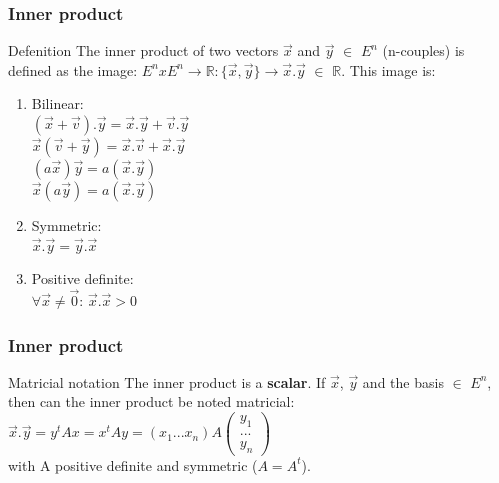 \begin{frame}
	\frametitle{Inner product}
	\begin{block}{Defenition}
		The inner product of two vectors $\overrightarrow{x}$ and $\overrightarrow{y}$ $\in$ $E^n$ (n-couples) is defined as the image: $E^nxE^n\to\mathbb{R}:\{\overrightarrow{x},\overrightarrow{y}\}\to\overrightarrow{x}.\overrightarrow{y}$ $\in$ $\mathbb{R}$. This image is:
		\begin{enumerate}
			\item Bilinear:\\ $(\overrightarrow{x}+\overrightarrow{v}).\overrightarrow{y}=\overrightarrow{x}.\overrightarrow{y}+\overrightarrow{v}.\overrightarrow{y}$\\
			$\overrightarrow{x}(\overrightarrow{v}+\overrightarrow{y})=\overrightarrow{x}.\overrightarrow{v}+\overrightarrow{x}.\overrightarrow{y}$\\
			$(a\overrightarrow{x})\overrightarrow{y}=a(\overrightarrow{x}.\overrightarrow{y})$\\
			$\overrightarrow{x}(a\overrightarrow{y})=a(\overrightarrow{x}.\overrightarrow{y})$
			\item Symmetric:\\
			$\overrightarrow{x}.\overrightarrow{y}=\overrightarrow{y}.\overrightarrow{x}$
			\item Positive definite:\\
			$\forall \overrightarrow{x} \neq \overrightarrow{0}$: $\overrightarrow{x} .\overrightarrow{x} > 0$
		\end{enumerate}
	\end{block}
\end{frame}

\begin{frame}
	\frametitle{Inner product}
	\begin{block}{Matricial notation}
		The inner product is a {\bf scalar}. If $\overrightarrow{x}$, $\overrightarrow{y}$ and the basis $\in$ $E^n$, then can the inner product be noted matricial:\\
		$\overrightarrow{x}.\overrightarrow{y}=y^tAx=x^tAy=(x_1...x_n)A\begin{pmatrix} y_1\\...\\y_n\end{pmatrix}$\\
		with A positive definite and symmetric ($A=A^t$).
	\end{block} 
\end{frame}

